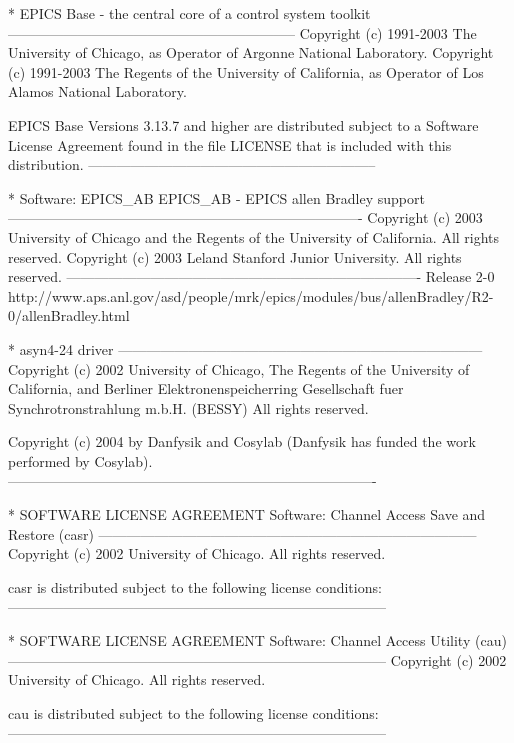 * EPICS Base - the central core of a control system toolkit
--------------------------------------------------------------
Copyright (c) 1991-2003 The University of Chicago, as Operator
of Argonne National Laboratory.
Copyright (c) 1991-2003 The Regents of the University of
California, as Operator of Los Alamos National Laboratory.

EPICS Base Versions 3.13.7 and higher are distributed
subject to a Software License Agreement found in the
file LICENSE that is included with this distribution.
--------------------------------------------------------------

* Software: EPICS_AB
EPICS_AB - EPICS allen Bradley support
----------------------------------------------------------------------------
Copyright (c) 2003 University of Chicago and the
 Regents of the University of California. All rights reserved.
Copyright (c) 2003 Leland Stanford Junior University. All rights reserved.
----------------------------------------------------------------------------
Release 2-0
http://www.aps.anl.gov/asd/people/mrk/epics/modules/bus/allenBradley/R2-0/allenBradley.html


* asyn4-24 driver
------------------------------------------------------------------------------
Copyright (c) 2002 University of Chicago, The Regents of the
University of California, and Berliner Elektronenspeicherring
Gesellschaft fuer Synchrotronstrahlung m.b.H. (BESSY) All rights
reserved.

Copyright (c) 2004 by Danfysik and Cosylab (Danfysik has funded the work
performed by Cosylab).
-------------------------------------------------------------------------------


 * SOFTWARE LICENSE AGREEMENT
 Software: Channel Access Save and Restore (casr)
--------------------------------------------------------------------------------- 
 Copyright (c) 2002 University of Chicago. All rights reserved.

casr is distributed subject to the following license conditions:
---------------------------------------------------------------------------------


* SOFTWARE LICENSE AGREEMENT
 Software: Channel Access Utility (cau)
---------------------------------------------------------------------------------
Copyright (c) 2002 University of Chicago. All rights reserved.

cau is distributed subject to the following license conditions:
---------------------------------------------------------------------------------



